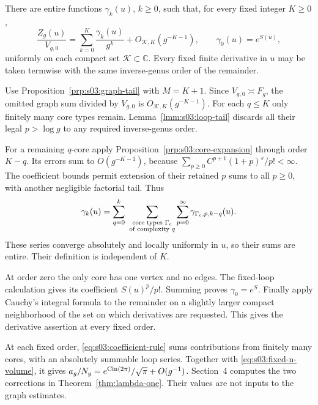 \begin{thm}
\label{thm:s03:graph-expansion}
There are entire functions $\gamma_k(u)$, $k\geq0$, such that,
for every fixed integer $K\geq0$,
\begin{equation}
\label{eq:s03:graph-expansion}
\frac{Z_g(u)}{V_{g,0}}
=\sum_{k=0}^K\frac{\gamma_k(u)}{g^k}
 +O_{\mathcal K,K}(g^{-K-1}),\qquad
\gamma_0(u)=e^{S(u)},
\end{equation}
uniformly on each compact set $\mathcal K\subset\mathbb C$.
Every fixed finite derivative in $u$ may be taken termwise with
the same inverse-genus order of the remainder.
\end{thm}
\begin{prf}
Use Proposition~\ref{prp:s03:graph-tail} with $M=K+1$.
Since $V_{g,0}\asymp F_g$, the omitted graph sum divided by
$V_{g,0}$ is $O_{\mathcal K,K}(g^{-K-1})$.
For each $q\leq K$ only finitely many core types remain.
Lemma~\ref{lmm:s03:loop-tail} discards all their legal
$p>\log g$ to any required inverse-genus order.

For a remaining $q$-core apply
Proposition~\ref{prp:s03:core-expansion} through order $K-q$.
Its errors sum to $O(g^{-K-1})$, because
$\sum_{p\geq0}C^{p+1}(1+p)^s/p!<\infty$.
The coefficient bounds permit extension of their retained $p$ sums
to all $p\geq0$, with another negligible factorial tail.
Thus
\begin{equation}
\label{eq:s03:coefficient-rule}
\gamma_k(u)=
 \sum_{q=0}^k\ \sum_{\substack{\text{core types }\Gamma_{\rm c}\\
                              \text{of complexity }q}}
 \sum_{p=0}^{\infty}\gamma_{\Gamma_{\rm c},p,k-q}(u).
\end{equation}
These series converge absolutely and locally uniformly in $u$, so
their sums are entire. Their definition is independent of $K$.

At order zero the only core has one vertex and no edges.
The fixed-loop calculation gives its coefficient $S(u)^p/p!$.
Summing proves $\gamma_0=e^S$.
Finally apply Cauchy's integral formula to the remainder on a slightly
larger compact neighborhood of the set on which derivatives are
requested. This gives the derivative assertion at every fixed order.
\end{prf}

\begin{rmk}
At each fixed order, \eqref{eq:s03:coefficient-rule} sums contributions
from finitely many cores, with an absolutely summable loop series.
Together with \eqref{eq:s03:fixed-n-volume}, it gives
$a_g/N_g=e^{\operatorname{\mathrm{Cin}}(2\pi)}/\sqrt\pi+O(g^{-1})$.
Section~4 computes the two corrections in Theorem~\ref{thm:lambda-one}.
Their values are not inputs to the graph estimates.
\end{rmk}

